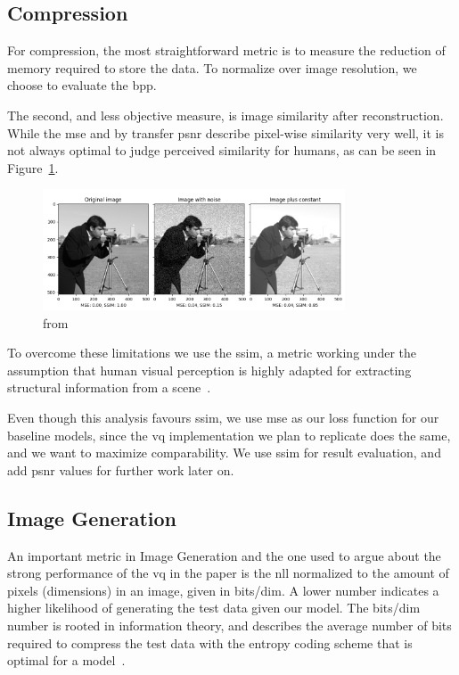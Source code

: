 \subsection{Compression}\label{subsec:compression}
For compression, the most straightforward metric is to measure the reduction of memory required to
store the data.
To normalize over image resolution, we choose to evaluate the \ac{bpp}.

The second, and less objective measure, is image similarity after reconstruction.
While the \ac{mse} and by transfer \ac{psnr} describe pixel-wise similarity very well, it is not
always optimal to judge perceived similarity for humans, as can be seen in Figure~\ref{fig:mse_ssim}.

\begin{figure}[ht]
    \centering
    \includegraphics[width=0.8\textwidth]{images/ssim_mse}
    \caption{from~\cite{scikit-ssim}}
    \label{fig:mse_ssim}
\end{figure}

To overcome these limitations we use the \ac{ssim}, a metric working under the assumption that human visual
perception is highly adapted for extracting structural information from a scene~\cite{ssim}.

Even though this analysis favours \ac{ssim}, we use \ac{mse} as our loss function for our baseline models,
since the \ac{vq} implementation we plan to replicate does the same, and we want to maximize comparability.
We use \ac{ssim} for result evaluation, and add \ac{psnr} values for further work later on.

\subsection{Image Generation}\label{subsec:image-generation}
An important metric in Image Generation and the one used to argue about the strong performance of the \ac{vq} in the
paper is the \ac{nll} normalized to the amount of pixels (dimensions) in an image, given in bits/dim.
A lower number indicates a higher likelihood of generating the test data given our model.
The bits/dim number is rooted in information theory, and describes the average number of bits required to
compress the test data with the entropy coding scheme that is optimal for a model~\cite{shannon}.

